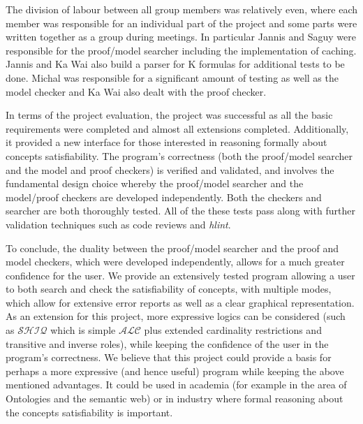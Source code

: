 
The division of labour between all group members was relatively even, where each member was responsible for an individual part of the project and some parts were written together as a group during meetings. In particular Jannis and Saguy were responsible for the proof/model searcher including the implementation of caching. Jannis and Ka Wai also build a parser for K formulas for additional tests to be done. Michal was responsible for a significant amount of testing as well as the model checker and Ka Wai also dealt with the proof checker. 

In terms of the project evaluation, the project was successful as all the basic requirements were completed and almost all extensions completed. Additionally, it provided a new interface for those interested in reasoning formally about concepts satisfiability. The program's correctness (both the proof/model searcher and the model and proof checkers) is verified and validated, and involves the fundamental design choice whereby the proof/model searcher and the model/proof checkers are developed independently. Both the checkers and searcher are both thoroughly tested. All of the these tests pass along with further validation techniques such as code reviews and \emph{hlint}.

To conclude, the duality between the proof/model searcher and the proof and model checkers, which were developed independently, allows for a much greater confidence for the user. We provide an extensively tested program allowing a user to both search and check the satisfiability of concepts, with multiple modes, which allow for extensive error reports as well as a clear graphical representation. As an extension for this project, more expressive logics can be considered (such as $\mathcal{SHIQ}$ which is simple $\mathcal{ALC}$ plus extended cardinality restrictions and transitive and inverse roles), while keeping the confidence of the user in the program's correctness. We believe that this project could provide a basis for perhaps a more expressive (and hence useful) program while keeping the above mentioned advantages. It could be used in academia (for example in the area of Ontologies and the semantic web) or in industry where formal reasoning about the concepts satisfiability is important. 


